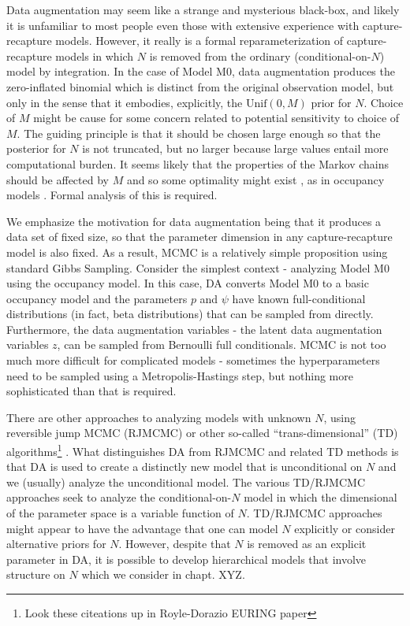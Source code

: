 Data augmentation may seem like a strange and mysterious black-box,
and likely it is unfamiliar to most people even those with extensive
experience with capture-recapture models. However, it really is a
formal reparameterization of capture-recapture models in which $N$ is
removed from the ordinary (conditional-on-$N$) model by integration.
In the case of Model M0, data augmentation produces the zero-inflated
binomial which is distinct from the original observation model, but
only in the sense that it embodies, explicitly, the $\mbox{Unif}(0,M)$
prior for $N$.  Choice of $M$ might be cause for some concern related
to potential sensitivity to choice of $M$. The guiding principle is
that it should be chosen large enough so that the posterior for $N$ is
not truncated, but no larger because large values entail more
computational burden. It seems likely that the properties of the
Markov chains should be affected by $M$ and so some optimality might
exist \citep{gopalaswamy_etal:2012}, as in occupancy models
\citep{mackenzie_royle:2005}. Formal analysis of this is required.


We emphasize the motivation for data augmentation being that it
produces a data set of fixed size, so that the parameter dimension in
any capture-recapture model is also fixed.  As a result, MCMC is a
relatively simple proposition using standard Gibbs Sampling.  Consider
the simplest context - analyzing Model M0 using the occupancy
model. In this case, DA converts Model M0 to a basic occupancy model
and the parameters $p$ and $\psi$ have known full-conditional
distributions (in fact, beta distributions) that can be sampled from
directly.  Furthermore, the data augmentation variables - the latent
data augmentation variables $z$, can be sampled from Bernoulli full
conditionals. MCMC is not too much more difficult for complicated
models - sometimes the hyperparameters need to be sampled using a
Metropolis-Hastings step, but nothing more sophisticated than that is
required.

There are other approaches to analyzing models with unknown $N$, using
reversible jump MCMC (RJMCMC) or other so-called ``trans-dimensional''
(TD) algorithms\footnote{Look these citeations up in Royle-Dorazio
  EURING paper} \citep{durbin_elston:2005, king_etal:XXXX,
  schofield_barker:XXXX}. What distinguishes DA from RJMCMC and
related TD methods is that DA is used to create a distinctly new model
that is unconditional on $N$ and we (usually) analyze the
unconditional model. The various TD/RJMCMC approaches seek to analyze
the conditional-on-$N$ model in which the dimensional of the parameter
space is a variable function of $N$. TD/RJMCMC approaches might appear
to have the advantage that one can model $N$ explicitly or consider
alternative priors for $N$. However, despite that $N$ is removed as an
explicit parameter in DA, it is possible to develop hierarchical
models that involve structure on $N$ \citep{converse_royle:2010,
  royle_etal:2011ms} which we consider in chapt.  XYZ.

